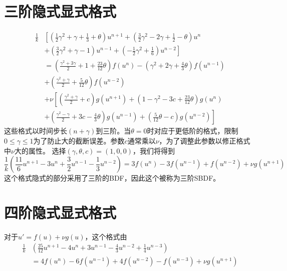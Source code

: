 \documentclass[12pt,a4paper]{article}
\begin{document}
\section{三阶隐式显式格式}
\begin{equation}
\begin{aligned}
\frac{1}{k}&\left[\left(\frac{1}{2}\gamma^2+\gamma+\frac{1}{3}+\theta\right)u^{n+1}+\left(\frac{3}{2}\gamma^2-2\gamma+\frac{1}{2}-\theta\right)u^n\right.\\
&\left.+\left(\frac{3}{2}\gamma^2+\gamma-1\right)u^{n-1}+\left(-\frac{1}{2}\gamma^2+\frac{1}{6}\right)u^{n-2}\right]\\
&=\left(\frac{\gamma^2+3\gamma}{2}+1+\frac{23}{12}\theta\right)f(u^n)-\left(\gamma^2+2\gamma+\frac{4}{3}\theta\right)f(u^{n-1})\\
&+\left(\frac{\gamma^2+\gamma}{2}+\frac{5}{12}\theta\right)f(u^{n-2})\\
&+\nu\left[\left(\frac{\gamma^2+\gamma}{2}+c\right)g(u^{n+1})+\left(1-\gamma^2-3c+\frac{23}{12}\theta\right)g(u^n)\right.\\
&\left.+\left(\frac{\gamma^2-\gamma}{2}+3c-\frac{4}{3}\theta\right)g(u^{n-1})+\left(\frac{5}{12}\theta-c\right)g(u^{n-2})\right]
\end{aligned}
\end{equation}
这些格式以时间步长$(n+\gamma)$到三阶。当$\theta=0$时对应于更低阶的格式，限制$0\le\gamma\le 1$为了防止大的截断误差。参数$c$通常乘以$\nu$，为了调整此参数以修正格式中$\nu$大的属性。
选择$(\gamma,\theta,c)=(1,0,0)$，我们将得到
\begin{equation}
\frac{1}{k}\left(\frac{11}{6}u^{n+1}-3u^n+\frac{3}{2}u^{n-1}-\frac{1}{3}u^{n-2}\right)=3f(u^n)-3f(u^{n-1})+f(u^{n-2})+\nu g(u^{n+1})
\end{equation}
这个格式隐式的部分采用了三阶的BDF，因此这个被称为三阶SBDF。
\section{四阶隐式显式格式}
对于$u'=f(u)+\nu g(u)$，这个格式由
\begin{equation}
\begin{aligned}
\frac{1}{k}&\left(\frac{25}{12}u^{n+1}-4u^n+3u^{n-1}-\frac{4}{3}u^{n-2}+\frac{1}{4}u^{n-3}\right)\\
&=4f(u^n)-6f(u^{n-1})+4f(u^{n-2})-f(u^{n-3})+\nu g(u^{n+1})
\end{aligned}
\end{equation}



\cite{tam19912d}

\end{document}
